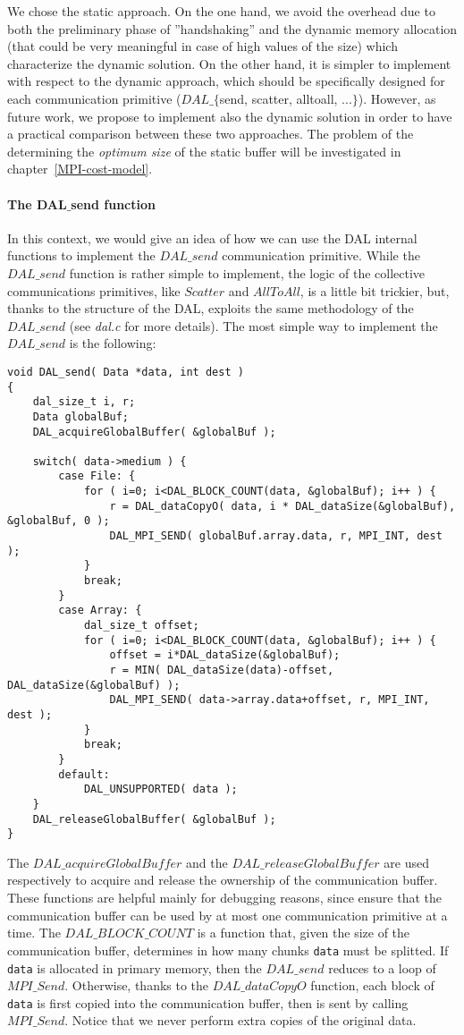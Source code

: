 We chose the static approach. On the one hand, we avoid the overhead due to both the preliminary phase of ''handshaking'' and the dynamic memory allocation (that could be very meaningful in case of high values of the size) which characterize the dynamic solution. On the other hand, it is simpler to implement with respect to the dynamic approach, which should be specifically designed for each communication primitive ($DAL\_\lbrace$send, scatter, alltoall, ...$\rbrace$). However, as future work, we propose to implement also the dynamic solution in order to have a practical comparison between these two approaches. The problem of the determining the \textit{optimum size} of the static buffer will be investigated in chapter~\ref{MPI-cost-model}.

\paragraph{The DAL$\_$send function}
In this context, we would give an idea of how we can use the DAL internal functions to implement the $DAL\_send$ communication primitive. While the $DAL\_send$ function is rather simple to implement, the logic of the collective communications primitives, like $Scatter$ and $AllToAll$, is a little bit trickier, but, thanks to the structure of the DAL, exploits the same methodology of the $DAL\_send$ (see \textit{dal.c} for more details). The most simple way to implement the $DAL\_send$ is the following:
\begin{lstlisting}
void DAL_send( Data *data, int dest )
{
	dal_size_t i, r;
	Data globalBuf;
	DAL_acquireGlobalBuffer( &globalBuf );

	switch( data->medium ) {
		case File: {
			for ( i=0; i<DAL_BLOCK_COUNT(data, &globalBuf); i++ ) {
				r = DAL_dataCopyO( data, i * DAL_dataSize(&globalBuf), &globalBuf, 0 );
				DAL_MPI_SEND( globalBuf.array.data, r, MPI_INT, dest );
			}
			break;
		}
		case Array: {
			dal_size_t offset;
			for ( i=0; i<DAL_BLOCK_COUNT(data, &globalBuf); i++ ) {
				offset = i*DAL_dataSize(&globalBuf);
				r = MIN( DAL_dataSize(data)-offset, DAL_dataSize(&globalBuf) );
				DAL_MPI_SEND( data->array.data+offset, r, MPI_INT, dest );
			}
			break;
		}
		default:
			DAL_UNSUPPORTED( data );
	}
	DAL_releaseGlobalBuffer( &globalBuf );
}
\end{lstlisting}
The $DAL\_acquireGlobalBuffer$ and the $DAL\_releaseGlobalBuffer$ are used respectively to acquire and release the ownership of the communication buffer. These functions are helpful mainly for debugging reasons, since ensure that the communication buffer can be used by at most one communication primitive at a time. The $DAL\_BLOCK\_COUNT$ is a function that, given the size of the communication buffer, determines in how many chunks \texttt{data} must be splitted. If \texttt{data} is allocated in primary memory, then the $DAL\_send$ reduces to a loop of $MPI\_Send$. Otherwise, thanks to the $DAL\_dataCopyO$ function, each block of \texttt{data} is first copied into the communication buffer, then is sent by calling $MPI\_Send$. Notice that we never perform extra copies of the original data.